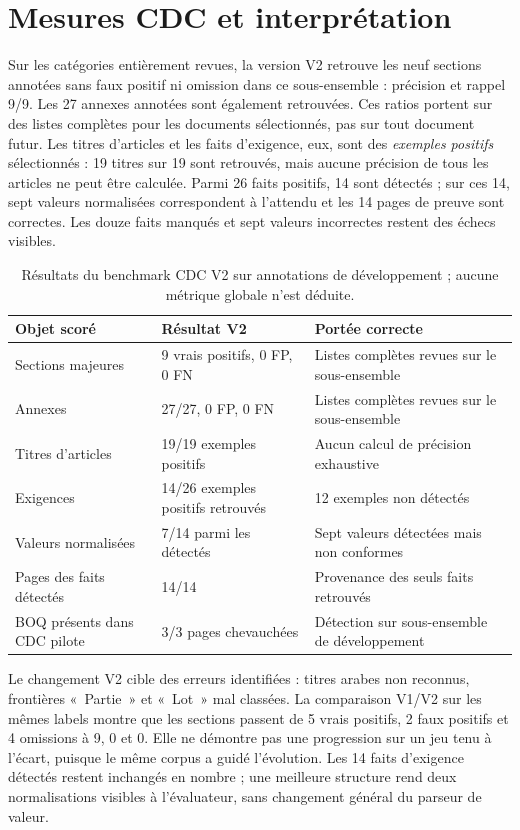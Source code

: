 \section{Mesures CDC et interprétation}
Sur les catégories entièrement revues, la version V2 retrouve les neuf sections annotées sans faux positif ni omission dans ce sous-ensemble : précision et rappel 9/9. Les 27 annexes annotées sont également retrouvées. Ces ratios portent sur des listes complètes pour les documents sélectionnés, pas sur tout document futur. Les titres d'articles et les faits d'exigence, eux, sont des \emph{exemples positifs} sélectionnés : 19 titres sur 19 sont retrouvés, mais aucune précision de tous les articles ne peut être calculée. Parmi 26 faits positifs, 14 sont détectés ; sur ces 14, sept valeurs normalisées correspondent à l'attendu et les 14 pages de preuve sont correctes. Les douze faits manqués et sept valeurs incorrectes restent des échecs visibles.

\begin{table}[htbp]\centering\tighttable
\begin{tabularx}{\textwidth}{@{}Y p{37mm}Y@{}}\toprule
Objet scoré & Résultat V2 & Portée correcte\\\midrule
Sections majeures & 9 vrais positifs, 0 FP, 0 FN & Listes complètes revues sur le sous-ensemble\\
Annexes & 27/27, 0 FP, 0 FN & Listes complètes revues sur le sous-ensemble\\
Titres d'articles & 19/19 exemples positifs & Aucun calcul de précision exhaustive\\
Exigences & 14/26 exemples positifs retrouvés & 12 exemples non détectés\\
Valeurs normalisées & 7/14 parmi les détectés & Sept valeurs détectées mais non conformes\\
Pages des faits détectés & 14/14 & Provenance des seuls faits retrouvés\\
BOQ présents dans CDC pilote & 3/3 pages chevauchées & Détection sur sous-ensemble de développement\\\bottomrule
\end{tabularx}
\caption{Résultats du benchmark CDC V2 sur annotations de développement ; aucune métrique globale n'est déduite.}\label{tab:cdc-resultats}
\end{table}

Le changement V2 cible des erreurs identifiées : titres arabes non reconnus, frontières «~Partie~» et «~Lot~» mal classées. La comparaison V1/V2 sur les mêmes labels montre que les sections passent de 5 vrais positifs, 2 faux positifs et 4 omissions à 9, 0 et 0. Elle ne démontre pas une progression sur un jeu tenu à l'écart, puisque le même corpus a guidé l'évolution. Les 14 faits d'exigence détectés restent inchangés en nombre ; une meilleure structure rend deux normalisations visibles à l'évaluateur, sans changement général du parseur de valeur.

